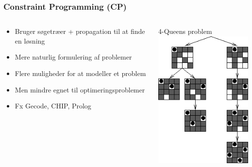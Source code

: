 \documentclass[smaller]{beamer}
\begin{document}
\begin{frame}
\frametitle{Constraint Programming (CP)}
\begin{columns}[T]
    \begin{column}[T]{.5\textwidth}
    \begin{itemize}[<+->]
\item Bruger søgetræer + propagation til at finde en løsning
\item Mere naturlig formulering af problemer
\item Flere muligheder for at modeller et problem
\item Men mindre egnet til optimeringsproblemer
\item Fx Gecode, CHIP, Prolog
\end{itemize}
\end{column} 
\begin{column}[T]{.5\textwidth} \vfill
\begin{center}
4-Queens problem \\
\includegraphics[scale=0.5]{cp.png}
\end{center}
\end{column}
\end{columns}
\end{frame}
\end{document}
